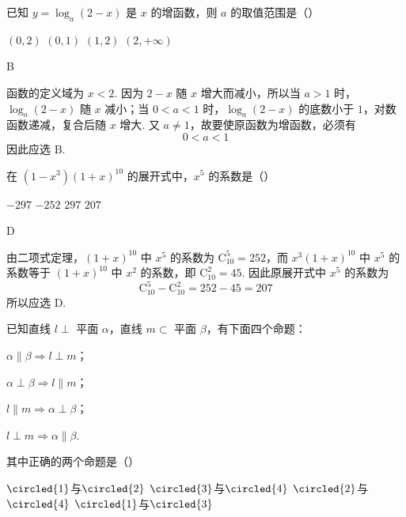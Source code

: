 \documentclass[UTF8,a4paper,oneside,11pt]{ctexbook}
\begin{document}
\begin{problem}
已知 \(y = \log_a(2 - x) \) 是 \(x \) 的增函数，则 \(a \) 的取值范围是（\quad）

\choices
    {\((0,2)\)}
    {\((0,1)\)}
    {\((1,2)\)}
    {\((2, + \infty)\)}
\end{problem}

\begin{answer}
B
\end{answer}

\begin{solution}
函数的定义域为 \(x<2\). 因为 \(2-x\) 随 \(x\) 增大而减小，所以当 \(a>1\) 时，\(\log_a(2-x)\) 随 \(x\) 减小；当 \(0<a<1\) 时，\(\log_a(2-x)\) 的底数小于 \(1\)，对数函数递减，复合后随 \(x\) 增大. 又 \(a\ne1\)，故要使原函数为增函数，必须有
\[
0<a<1
\]
因此应选 B.
\end{solution}

\begin{problem}
在 \((1 - x^{3})(1 + x)^{10}\) 的展开式中，\(x^{5}\) 的系数是（\quad）

\choices
    {\(-297\)}
    {\(-252\)}
    {\(297\)}
    {\(207\)}
\end{problem}

\begin{answer}
D
\end{answer}

\begin{solution}
由二项式定理，\((1+x)^{10}\) 中 \(x^5\) 的系数为 \(\mathrm C_{10}^{5}=252\)，而 \(x^3(1+x)^{10}\) 中 \(x^5\) 的系数等于 \((1+x)^{10}\) 中 \(x^2\) 的系数，即 \(\mathrm C_{10}^{2}=45\). 因此原展开式中 \(x^5\) 的系数为
\[
\mathrm C_{10}^{5}-\mathrm C_{10}^{2}=252-45=207
\]
所以应选 D.
\end{solution}

\begin{problem}
已知直线 \(l \perp\) 平面 \(\alpha\)，直线 \(m \subset\) 平面 \(\beta\)，有下面四个命题：

\begin{circlelist}
\item \(\alpha \parallel \beta \Rightarrow l \perp m\)；
\item \(\alpha \perp \beta \Rightarrow l \parallel m\)；
\item \(l \parallel m \Rightarrow \alpha \perp \beta\)；
\item \(l \perp m \Rightarrow \alpha \parallel \beta\).
\end{circlelist}

其中正确的两个命题是（\quad）

\choices
    {\(\circled{1}\)与\(\circled{2}\)}
    {\(\circled{3}\)与\(\circled{4}\)}
    {\(\circled{2}\)与\(\circled{4}\)}
    {\(\circled{1}\)与\(\circled{3}\)}
\end{problem}
\end{document}
